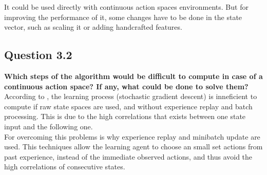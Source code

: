 \documentclass[12pt]{article}
\begin{document}
It could be used directly with continuous action spaces environments. But for improving the performance of it, some changes have to be done in the state vector, such as scaling it or adding handcrafted features.

\subsection{Question 3.2}
\textbf{Which steps of the algorithm would be difficult to compute in case of a continuous action space? If any, what could be done to solve them?}\\

According to \cite{mnih2013playing}, the learning process (stochastic gradient descent) is inneficient to compute if raw state spaces are used, and without experience replay and batch processing. This is due to the high correlations that exists between one state input and the following one. \\

For overcoming this problems is why experience replay and minibatch update are used. This techniques allow the learning agent to choose an small set actions from past experience, instead of the immediate observed actions, and thus avoid the high correlations of consecutive states.


\end{document}
